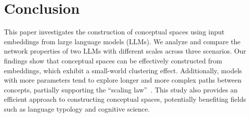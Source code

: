


\section{Conclusion}
This paper investigates the construction of conceptual spaces using input embeddings from large language models (LLMs). We analyze and compare the network properties of two LLMs with different scales across three scenarios. Our findings show that conceptual spaces can be effectively constructed from embeddings, which exhibit a small-world clustering effect. Additionally, models with more parameters tend to explore longer and more complex paths between concepts, partially supporting the ``scaling law''~\cite{kaplan2020scaling}. This study also provides an efficient approach to constructing conceptual spaces, potentially benefiting fields such as language typology and cognitive science.

